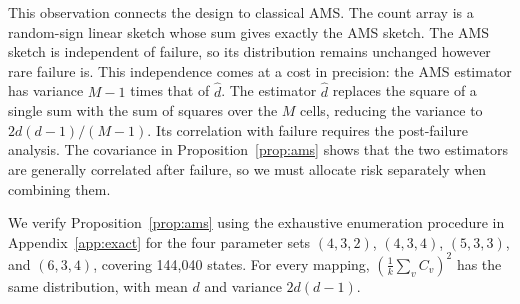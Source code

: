 This observation connects the design to classical AMS. The count array is a random-sign linear sketch whose sum gives exactly the AMS sketch. The AMS sketch is independent of failure, so its distribution remains unchanged however rare failure is. This independence comes at a cost in precision: the AMS estimator has variance $M-1$ times that of $\widehat d$. The estimator $\widehat d$ replaces the square of a single sum with the sum of squares over the $M$ cells, reducing the variance to $2d(d-1)/(M-1)$. Its correlation with failure requires the post-failure analysis. The covariance in Proposition~\ref{prop:ams} shows that the two estimators are generally correlated after failure, so we must allocate risk separately when combining them.

We verify Proposition~\ref{prop:ams} using the exhaustive enumeration procedure in Appendix~\ref{app:exact} for the four parameter sets $(4,3,2)$, $(4,3,4)$, $(5,3,3)$, and $(6,3,4)$, covering 144,040 states. For every mapping, $(\frac1k\sum_vC_v)^2$ has the same distribution, with mean $d$ and variance $2d(d-1)$.
